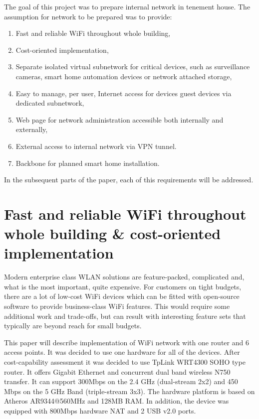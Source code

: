 \documentclass{llncs}
\begin{document}
The goal of this project was to prepare internal network in tenement house. The
assumption for network to be prepared was to provide:

\begin{enumerate}
  \item Fast and reliable WiFi throughout whole building,
  \item Cost-oriented implementation,
  \item Separate isolated virtual subnetwork for critical devices, such as surveillance cameras, smart home automation devices or network attached storage,
  \item Easy to manage, per user, Internet access for devices guest devices via
  dedicated subnetwork,
  \item Web page for network administration accessible both internally and
  externally,
  \item External access to internal network via VPN tunnel.
  \item Backbone for planned smart home installation.
\end{enumerate}

In the subsequent parts of the paper, each of this requirements will be addressed.

\section{Fast and reliable WiFi throughout whole building \& cost-oriented implementation}
Modern enterprise class WLAN solutions are feature-packed, complicated and, what is the most important, quite expensive. For customers on tight budgets, there are a lot of low-cost WiFi devices which can be fitted with open-source software to provide business-class WiFi features. This would require some additional work and trade-offs, but can result with interesting feature sets that typically are beyond reach for small budgets.

This paper will describe implementation of WiFi network with one router and 6 access points. It was decided to use one hardware for all of the devices. After cost-capability assessment it was decided to use TpLink WRT4300 SOHO type router. It offers Gigabit Ethernet and concurrent dual band wireless N750 transfer. It can support 300Mbps on the 2.4 GHz (dual-stream 2x2) and 450 Mbps on the 5 GHz Band (triple-stream 3x3). The hardware platform is based on Atheros AR9344@560MHz and 128MB RAM. In addition, the device was equipped with 800Mbps hardware NAT and 2 USB v2.0 ports. 
\end{document}
